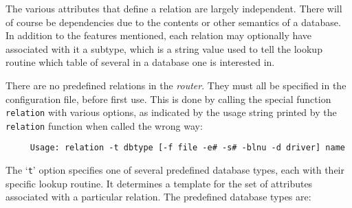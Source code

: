 The various attributes that define a relation are largely independent.
There will of course be dependencies due to the contents or other semantics
of a database.  In addition to the features mentioned, each relation may
optionally have associated with it a subtype, which is a string value used
to tell the lookup routine which table of several in a database
one is interested in.

There are no predefined relations in the {\em router\/}.  They must all be
specified in the configuration file, before first use.  This is done by
calling the special function {\tt relation} with various options, as indicated
by the usage string printed by the {\tt relation} function when called the wrong
way:

\begin{tscreen}
\begin{verbatim}
     Usage: relation -t dbtype [-f file -e# -s# -blnu -d driver] name
\end{verbatim}
\end{tscreen}


The `{\tt t}' option specifies one of several predefined database types, each
with their specific lookup routine.  It determines a template for the set
of attributes associated with a particular relation.  The predefined
database types are:



